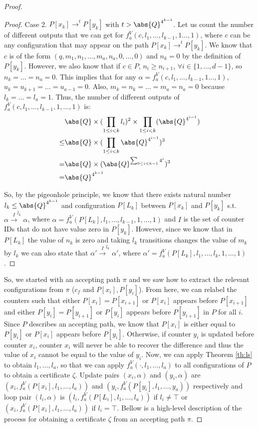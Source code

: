\begin{proof}
\begin{proof}
Case 2. $P[x_k]\xrightarrow{}^t P[y_k]$ with $t>\abs{Q}^{4^{k-1}}$. Let us count the number of different outputs that we can get for $f_a^V(c,l_1,\dots,l_{k-1},1\dots,1)$, where $c$ can be any configuration that may appear on the path $P[x_k]\xrightarrow{}^t P[y_k]$. We know that $c$ is of the form $(q,m_1,n_1,\dots,m_a,n_a,0,\dots,0)$ and $n_k=0$ by the definition of $P[y_k]$. However, we also know that if $c\in P$, $n_i\geq n_{i+1}$, $\forall i\in\{1,\dots,d-1\}$, so $n_k=\dots=n_a=0$. This implies that for any $\alpha=f_a^V(c,l_1,\dots,l_{k-1},1\dots,1)$, $u_k=u_{k+1}=\dots=u_{a-1}=0$. Also, $m_k=n_k=\dots=m_{a}=n_a=0$ because $l_k=\dots=l_a=1$. Thus, the number of different outputs of $f_a^V(c,l_1,\dots,l_{k-1},1,\dots,1)$ is:
\begin{align*}
&\abs{Q}\times(\prod_{1\leq i<k}l_i)^2\times\prod_{1\leq i<k}(\abs{Q}^{4^{i-1}})\\
\leq &\abs{Q}\times(\prod_{1\leq i<k} \abs{Q}^{4^{i-1}})^3\\
=&\abs{Q}\times(\abs{Q}^{\sum_{0\leq i<k-1}4^i})^3\\
=&\abs{Q}^{4^{k-1}}
\end{align*}

So, by the pigeonhole principle, we know that there exists natural number $l_k\leq\abs{Q}^{4^{k-1}}$ and configuration $P[L_k]$ between $P[x_k]$ and $P[y_k]$ s.t. $\alpha\xrightarrow{I}^{l_k}\alpha$, where $\alpha=f_a^V(P[L_k],l_1,\dots,l_{k-1},1,\dots,1)$ and $I$ is the set of counter IDs that do not have value zero in $P[y_k]$. However, since we know that in $P[L_k]$ the value of $n_k$ is zero and taking $l_k$ transitions changes the value of $m_k$ by $l_k$ we can also state that $\alpha'\xrightarrow{I}^{l_k}\alpha'$, where $\alpha'=f_a^V(P[L_k],l_1,\dots,l_k,1,\dots,1)$.

\end{proof}

So, we started with an accepting path $\pi$ and we saw how to extract the relevant configurations from $\pi$ ($c_f$ and $P[x_i],P[y_i]$). From here, we can relabel the counters such that either $P[x_i]=P[x_{i+1}]$ or $P[x_i]$ appears before $P[x_{i+1}]$ and either $P[y_{i}]=P[y_{i+1}]$ or $P[y_i]$ appears before $P[y_{i+1}]$ in $P$ for all $i$. Since $P$ describes an accepting path, we know that $P[x_i]$ is either equal to $P[y_{i}]$ or $P[x_{i}]$ appears before $P[y_{i}]$. Otherwise, if counter $y_i$ is updated before counter $x_i$, counter $x_i$ will never be able to recover the difference and thus the value of $x_i$ cannot be equal to the value of $y_i$. Now, we can apply Theorem \ref{th:ls} to obtain $l_1,\dots,l_a$, so that we can apply $f_a^V(\cdot,l_1,\dots,l_a)$ to all configurations of $P$ to obtain a certificate $\zeta$. Update pairs $(x_i,\alpha)$ and $(y_i,\alpha)$ are  $(x_i,f^V_a(P[x_i],l_1,\dots,l_a))$ and $(y_i,f^V_a(P[y_i],l_1,\dots,y_a))$ respectively and loop pair $(l_i,\alpha)$ is $(l_i,f^V_a(P[L_i],l_1,\dots,l_a))$ if $l_i\neq\top$ or $(x_i, f^V_a(P[x_i],l_1,\dots,l_a))$ if $l_i=\top$. Bellow is a high-level description of the process for obtaining a certificate $\zeta$ from an accepting path $\pi$.


\end{proof}
